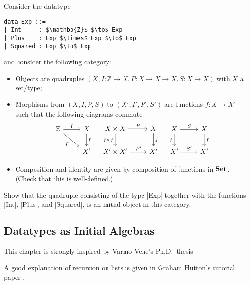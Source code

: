 \begin{exer}
  Consider the datatype
\begin{lstlisting}[mathescape=true]
data Exp ::=
| Int     : $\mathbb{Z}$ $\to$ Exp
| Plus    : Exp $\times$ Exp $\to$ Exp
| Squared : Exp $\to$ Exp
\end{lstlisting}
  and consider the following category:
  \begin{itemize}
  \item Objects are quadruples $(X, I : \mathbb{Z} \to X, P : X \to X \to X, S : X \to X)$ with $X$ a set/type;
  \item Morphisms from $(X, I, P, S)$ to $(X', I', P', S')$ are functions
    $f : X \to X'$ such that the following diagrams commute:
    \[
      \begin{tikzcd}
        \mathbb{Z} \ar[r, "I"] \ar[rd, "I'"']
        &
        X \ar[d, "f"]
        \\
        &
        X'
      \end{tikzcd}
      \quad
      \begin{tikzcd}
        X\times X \ar[r, "P"] \ar[d, "f \times f"']
        &
        X \ar[d, "f"]
        \\
        X' \times X' \ar[r, "P'"]
        &
        X'
      \end{tikzcd}
      \quad
      \begin{tikzcd}
        X \ar[r, "S"] \ar[d, "f"']
        &
        X \ar[d, "f"]
        \\
        X' \ar[r, "S'"]
        &
        X'
      \end{tikzcd}
    \]
  \item Composition and identity are given by composition of functions in $\mathbf{Set}$. (Check that this is well-defined.)
  \end{itemize}
  
    Show that the quadruple consisting of the type |Exp| together with the functions |Int|, |Plus|, and |Squared|, is an initial object in this category.
\end{exer}

\subsection{Datatypes as Initial Algebras}
\label{sec:datatypes-as-initial}



\begin{reading*}
  This chapter is strongly inspired by Varmo Vene's Ph.D.\ thesis \cite[Chapter 2]{vene_phd}.

  A good explanation of recursion on lists is given in Graham Hutton's tutorial paper \cite{DBLP:journals/jfp/Hutton99}.
\end{reading*}

